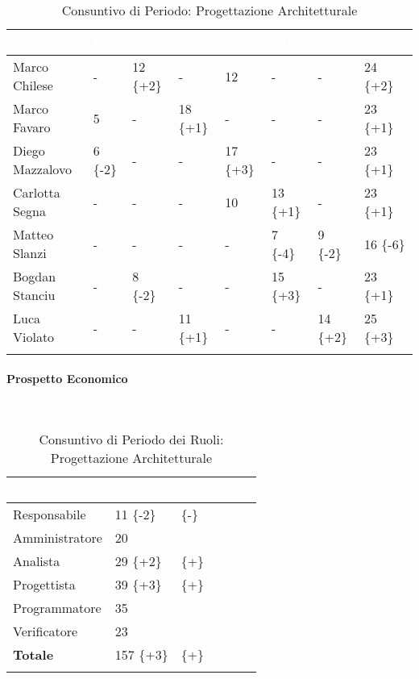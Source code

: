 \begin{longtable}{|C{.30\textwidth}|C{.06\textwidth}|C{.06\textwidth}|C{.06\textwidth} | C{.06\textwidth}| C{.06\textwidth} | C{.06\textwidth} | C{.10\textwidth} |}
\hline
{}	\textbf{\textcolor{white}{Nome}} & \textbf{\textcolor{white}{RE}} & \textbf{\textcolor{white}{AM}} & \textbf{\textcolor{white}{AN}} & \textbf{\textcolor{white}{PJ}} & \textbf{\textcolor{white}{PR}} & \textbf{\textcolor{white}{VE}} & \textbf{\textcolor{white}{Totale}}\\
\hline 
Marco Chilese & - & 12 \{+2\} & - & 12 & - & - & 24 \{+2\} \\
\hline
{}Marco Favaro & 5 & - & 18 \{+1\}  & - & - & - & 23 \{+1\} \\
\hline
Diego Mazzalovo & 6 \{-2\}& - & - & 17 \{+3\} & - & - & 23 \{+1\} \\ 
\hline
{}Carlotta Segna & - & - & - & 10 & 13 \{+1\} & - & 23 \{+1\} \\
\hline
Matteo Slanzi & - & - & - & - & 7 \{-4\} & 9 \{-2\} & 16 \{-6\} \\
\hline
{}Bogdan Stanciu & - & 8 \{-2\}& - & - & 15 \{+3\} & - & 23 \{+1\} \\
\hline
Luca Violato & - & - & 11 \{+1\} & - & - & 14 \{+2\} & 25 \{+3\} \\
\hline 

\caption{Consuntivo di Periodo: Progettazione Architetturale}
\label{Distribuzione oraria del periodo di pa}
\end{longtable}


\paragraph{Prospetto Economico} ~\\

\begin{longtable}{| C{.30\textwidth}| C{.15\textwidth}| C{.20\textwidth}|}
\hline
{}\textbf{\textcolor{white}{Ruolo}} & \textbf{\textcolor{white}{Ore}} & \textbf{\textcolor{white}{Costo in \euro}} \\
\hline 
Responsabile & 11 \{-2\}&  \{-\} \\
\hline
{}Amministratore & 20 &  \\
\hline
Analista & 29 \{+2\} &  \{+\}\\
\hline
{}Progettista & 39 \{+3\} &  \{+\}\\
\hline
Programmatore & 35 &  \\
\hline
{}Verificatore & 23 & \\
\hline
\textbf{Totale} & 157 \{+3\} &  \{+\}\\ 
\hline

\caption{Consuntivo di Periodo dei Ruoli: Progettazione Architetturale}
\label{Distribuzione oraria per ruoli del periodo di pa}
\end{longtable}

